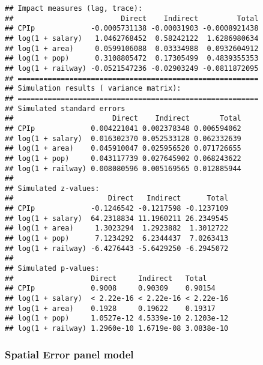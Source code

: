 \documentclass[
]{article}
\begin{document}
\begin{verbatim}
## Impact measures (lag, trace):
##                         Direct    Indirect         Total
## CPIp             -0.0005731138 -0.00031903 -0.0008921438
## log(1 + salary)   1.0462768452  0.58242122  1.6286980634
## log(1 + area)     0.0599106088  0.03334988  0.0932604912
## log(1 + pop)      0.3108805472  0.17305499  0.4839355353
## log(1 + railway) -0.0521547236 -0.02903249 -0.0811872095
## ========================================================
## Simulation results ( variance matrix):
## ========================================================
## Simulated standard errors
##                       Direct    Indirect       Total
## CPIp             0.004221041 0.002378348 0.006594062
## log(1 + salary)  0.016302370 0.052533128 0.062332639
## log(1 + area)    0.045910047 0.025956520 0.071726655
## log(1 + pop)     0.043117739 0.027645902 0.068243622
## log(1 + railway) 0.008080596 0.005169565 0.012885944
## 
## Simulated z-values:
##                      Direct   Indirect      Total
## CPIp             -0.1246542 -0.1217598 -0.1237109
## log(1 + salary)  64.2318834 11.1960211 26.2349545
## log(1 + area)     1.3023294  1.2923882  1.3012722
## log(1 + pop)      7.1234292  6.2344437  7.0263413
## log(1 + railway) -6.4276443 -5.6429250 -6.2945072
## 
## Simulated p-values:
##                  Direct     Indirect   Total     
## CPIp             0.9008     0.90309    0.90154   
## log(1 + salary)  < 2.22e-16 < 2.22e-16 < 2.22e-16
## log(1 + area)    0.1928     0.19622    0.19317   
## log(1 + pop)     1.0527e-12 4.5339e-10 2.1203e-12
## log(1 + railway) 1.2960e-10 1.6719e-08 3.0838e-10
\end{verbatim}

\hypertarget{spatial-error-panel-model}{%
\subsubsection{Spatial Error panel
model}\label{spatial-error-panel-model}}
\end{document}
